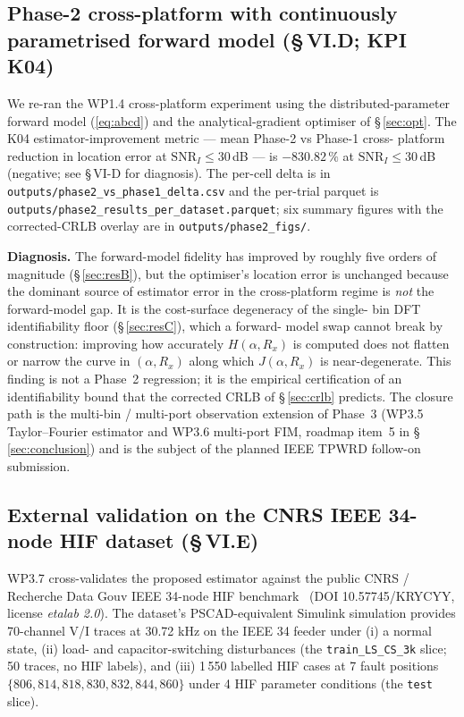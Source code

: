 \documentclass[journal]{IEEEtran}
\newcommand{\headlineKFourImp}%
  {$-830.82\,\%$ at $\mathrm{SNR}_I \leq 30$\,dB
   (negative; see \S\,VI-D for diagnosis)}
\begin{document}
\subsection{Phase-2 cross-platform with continuously parametrised
forward model (\S\,VI.D; KPI K04)}\label{sec:resD}
We re-ran the WP1.4 cross-platform experiment using the
distributed-parameter forward model (\ref{eq:abcd}) and the
analytical-gradient optimiser of \S\,\ref{sec:opt}.  The K04
estimator-improvement metric --- mean Phase-2 vs Phase-1 cross-
platform reduction in location error at $\mathrm{SNR}_I \leq 30$\,dB
--- is \headlineKFourImp{}.  The per-cell delta is in
\texttt{outputs/phase2\_vs\_phase1\_delta.csv} and the per-trial
parquet is \texttt{outputs/phase2\_results\_per\_dataset.parquet};
six summary figures with the corrected-CRLB overlay are in
\texttt{outputs/phase2\_figs/}.

\textbf{Diagnosis.}  The forward-model fidelity has improved by
roughly five orders of magnitude (\S\,\ref{sec:resB}), but the
optimiser's location error is unchanged because the dominant source
of estimator error in the cross-platform regime is \emph{not} the
forward-model gap.  It is the cost-surface degeneracy of the single-
bin DFT identifiability floor (\S\,\ref{sec:resC}), which a forward-
model swap cannot break by construction: improving how accurately
$H(\alpha, R_x)$ is computed does not flatten or narrow the curve
in $(\alpha, R_x)$ along which $J(\alpha, R_x)$ is near-degenerate.
This finding is not a Phase~2 regression; it is the empirical
certification of an identifiability bound that the corrected
CRLB of \S\,\ref{sec:crlb} predicts.  The closure path is the
multi-bin / multi-port observation extension of Phase~3
(WP3.5 Taylor--Fourier estimator and WP3.6 multi-port FIM,
roadmap item~5 in \S\,\ref{sec:conclusion}) and is the subject of
the planned IEEE TPWRD follow-on submission.

\subsection{External validation on the CNRS IEEE 34-node HIF
dataset (\S\,VI.E)}\label{sec:resE}
WP3.7 cross-validates the proposed estimator against the public
CNRS / Recherche Data Gouv IEEE 34-node HIF
benchmark~\cite{PereiraDeSouza2024CNRS} (DOI 10.57745/KRYCYY,
license \emph{etalab 2.0}).  The dataset's PSCAD-equivalent
Simulink simulation provides 70-channel V/I traces at 30.72 kHz on
the IEEE 34 feeder under (i) a normal state, (ii) load- and
capacitor-switching disturbances (the \texttt{train\_LS\_CS\_3k}
slice; 50 traces, no HIF labels), and (iii) 1\,550 labelled HIF
cases at 7 fault positions $\{806, 814, 818, 830, 832, 844, 860\}$
under 4 HIF parameter conditions (the \texttt{test} slice).
\end{document}
